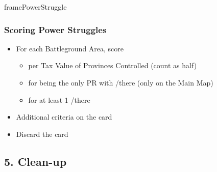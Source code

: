 \documentclass[10pt]{article}
\newlength{\fhPowerStruggle} \setlength\fhPowerStruggle{9\baselineskip}
\begin{document}
\begin{dynamiccontents*}{framePowerStruggle}\begin{eubox}{\fhPowerStruggle}
	\subsubsection*{Scoring Power Struggles }
	\begin{itemize}
		\item For each Battleground Area, score
		\begin{itemize}
			\item {} per Tax Value of Provinces Controlled (\vassals count as half)
			\item {} for being the only PR with \towns/\vassals there (only on the Main Map)
			\item {} for at least 1 \alliance/\marriage there
		\end{itemize}
		\item Additional criteria on the card
		\item Discard the card
	\end{itemize}
\end{eubox}\end{dynamiccontents*}

\subsection*{5. Clean-up}
\end{document}
